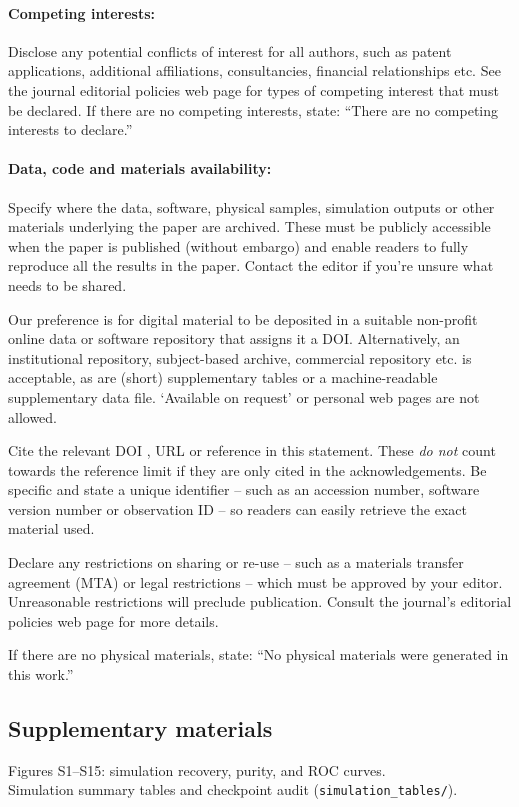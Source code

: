 \documentclass[12pt]{article}
\begin{document}
\paragraph*{Competing interests:}
Disclose any potential conflicts of interest for all authors, such as patent applications,
additional affiliations, consultancies, financial relationships etc.
See the journal editorial policies web page for types of competing interest that must be declared.
If there are no competing interests, state:
``There are no competing interests to declare.''
\paragraph*{Data, code and materials availability:}
Specify where the data, software, physical samples, simulation outputs or other materials
underlying the paper are archived.
These must be publicly accessible when the paper is published (without embargo) and enable
readers to fully reproduce all the results in the paper.
Contact the editor if you’re unsure what needs to be shared.

Our preference is for digital material to be deposited in a suitable non-profit online data or
software repository that assigns it a DOI.
Alternatively, an institutional repository, subject-based archive, commercial repository etc.
is acceptable, as are (short) supplementary tables or a machine-readable supplementary data file.
`Available on request’ or personal web pages are not allowed.

Cite the relevant DOI \cite{dataset}, URL \cite{example_url} or reference \cite{example2}
in this statement.
These \textit{do not} count towards the reference limit if they are only cited in the acknowledgements.
Be specific and state a unique identifier -- such as an accession number, software version number
or observation ID -- so readers can easily retrieve the exact material used.

Declare any restrictions on sharing or re-use -- such as a materials transfer agreement (MTA) or
legal restrictions -- which must be approved by your editor.
Unreasonable restrictions will preclude publication.
Consult the journal's editorial policies web page for more details.

If there are no physical materials, state:
``No physical materials were generated in this work.''


\subsection*{Supplementary materials}
Figures S1--S15: simulation recovery, purity, and ROC curves.\\
Simulation summary tables and checkpoint audit (\texttt{simulation\_tables/}).
\end{document}
